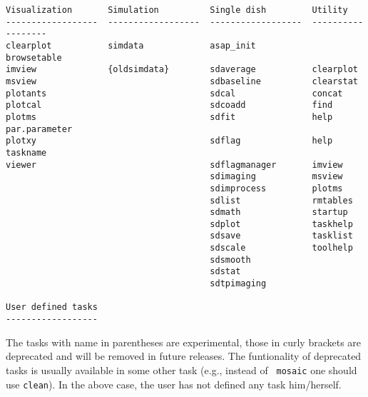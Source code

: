 \begin{verbatim}
Visualization       Simulation          Single dish         Utility           
------------------  ------------------  ------------------  ------------------
clearplot           simdata             asap_init           browsetable       
imview              {oldsimdata}        sdaverage           clearplot         
msview                                  sdbaseline          clearstat         
plotants                                sdcal               concat            
plotcal                                 sdcoadd             find              
plotms                                  sdfit               help par.parameter
plotxy                                  sdflag              help taskname     
viewer                                  sdflagmanager       imview            
                                        sdimaging           msview            
                                        sdimprocess         plotms            
                                        sdlist              rmtables          
                                        sdmath              startup           
                                        sdplot              taskhelp          
                                        sdsave              tasklist          
                                        sdscale             toolhelp          
                                        sdsmooth                              
                                        sdstat                                
                                        sdtpimaging                           

User defined tasks
------------------

\end{verbatim}
\normalsize
The tasks with name in parentheses are experimental, those in curly brackets
are deprecated and will be removed in future releases. The
funtionality of deprecated
tasks is usually available in some other task (e.g., instead of {\tt
  mosaic} one should use {\tt clean}). In the above
case, the user has not defined any task him/herself.

